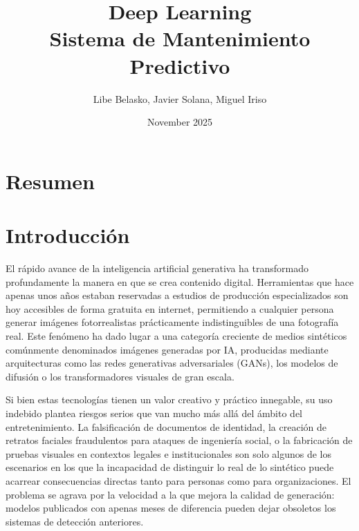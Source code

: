 \documentclass[12pt,a4paper,twoside]{article}
\title{Deep Learning\\ Sistema de Mantenimiento Predictivo}
\author{Libe Belasko, Javier Solana, Miguel Iriso}
\date{November 2025}
\begin{document}

\newpage
\pagestyle{empty}
\section*{Resumen}

\newpage
{}
\pagestyle{plain}
\tableofcontents
\newpage
\listoffigures  %
\newpage
\listoftables   %
\newpage
\pagestyle{plain}

\pretocmd{\section}{\cleardoublepage}{}{}

\section{Introducción}
El rápido avance de la inteligencia artificial generativa ha transformado profundamente la manera
en que se crea contenido digital. Herramientas que hace apenas unos años estaban reservadas a
estudios de producción especializados son hoy accesibles de forma gratuita en internet, permitiendo
a cualquier persona generar imágenes fotorrealistas prácticamente indistinguibles de una fotografía
real. Este fenómeno ha dado lugar a una categoría creciente de medios sintéticos comúnmente
denominados imágenes generadas por IA, producidas mediante arquitecturas como las redes
generativas adversariales (GANs), los modelos de difusión o los transformadores visuales de gran
escala.

Si bien estas tecnologías tienen un valor creativo y práctico innegable, su uso indebido plantea
riesgos serios que van mucho más allá del ámbito del entretenimiento. La falsificación de documentos
de identidad, la creación de retratos faciales fraudulentos para ataques de ingeniería social, o
la fabricación de pruebas visuales en contextos legales e institucionales son solo algunos de los
escenarios en los que la incapacidad de distinguir lo real de lo sintético puede acarrear
consecuencias directas tanto para personas como para organizaciones. El problema se agrava por la
velocidad a la que mejora la calidad de generación: modelos publicados con apenas meses de
diferencia pueden dejar obsoletos los sistemas de detección anteriores.
\end{document}
